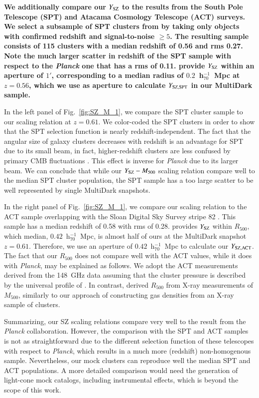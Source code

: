 \documentclass[useAMS,usenatbib]{mn2e}
\begin{document}
{\bf We additionally compare our $Y_{{\mathrm{SZ}}}$ to the results from the South Pole 
Telescope (SPT) and Atacama Cosmology Telescope (ACT) surveys.
We select a subsample of SPT clusters from \cite{2013ApJ...763..127R} by taking
only objects with confirmed redshift and signal-to-noise $\ge 5$. The resulting sample 
consists of 115 clusters with a median redshift of 0.56 and rms 0.27. Note the much larger 
scatter in redshift of the SPT sample with respect to the \emph{Planck} one that has 
a rms of 0.11. \cite{2013ApJ...763..127R} provide $Y_{{\mathrm{SZ}}}$ 
within an aperture of $1'$, corresponding to a median radius of $0.2$~h$_{70}^{-1}$~Mpc 
at $z = 0.56$, which we use as aperture to calculate $Y_{{\mathrm{SZ, SPT}}}$ in our MultiDark sample.

In the left panel of Fig.~\ref{fig:SZ_M_1}, we compare the SPT cluster sample to our 
scaling relation at $z = 0.61$. We color-coded the SPT clusters in order to show that the SPT 
selection function is nearly redshift-independent. The fact that the angular size of galaxy clusters 
decreases with redshift is an advantage for SPT due to its small beam, in fact, higher-redshift clusters 
are less confused by primary CMB fluctuations \citep{2013ApJ...763..127R}. This effect is inverse 
for \emph{Planck} due to its larger beam. We can conclude that while our $Y_{{\mathrm{SZ}}}-M_{500}$ 
scaling relation compare well to the median SPT cluster population, the SPT sample has a too
large scatter to be well represented by single MultiDark snapshots.

In the right panel of Fig.~\ref{fig:SZ_M_1}, we compare our scaling relation to
the ACT sample overlapping with the Sloan Digital Sky Survey stripe 82 
\citep{2013JCAP...07..008H}. This sample has a median redshift of 0.58 with rms 
of 0.28. \cite{2013JCAP...07..008H} provides $Y_{{\mathrm{SZ}}}$ within $R_{500}$, which
median, $0.42$~h$_{70}^{-1}$~Mpc, is almost half of ours at the
MultiDark snapshot $z=0.61$. Therefore, we use an aperture of $0.42$~h$_{70}^{-1}$~Mpc
to calculate our $Y_{{\mathrm{SZ, ACT}}}$. 
The fact that our $R_{500}$ does not compare well with the ACT values, while it does with 
\emph{Planck}, may be explained as follows. We adopt the ACT measurements derived from 
the 148~GHz data assuming that the cluster pressure is described by the universal 
profile of \cite{2010A&A...517A..92A}. In contrast, \cite{2013arXiv1303.5080P}
derived $R_{500}$ from X-ray measurements of $M_{500}$, similarly to
our approach of constructing gas densities from an X-ray sample of clusters. 

Summarizing, our SZ scaling relations compare very well to the result from
the \emph{Planck} collaboration. However, the comparison with the SPT and 
ACT samples is not as straightforward due to the different selection function 
of these telescopes with respect to \emph{Planck}, which results in a much
more (redshift) non-homogenous sample. Nevertheless, our mock clusters 
can reproduce well the median SPT and ACT populations. A more detailed
comparison would need the generation of light-cone mock catalogs,
including instrumental effects, which is beyond the scope of this 
work.} 
\end{document}
